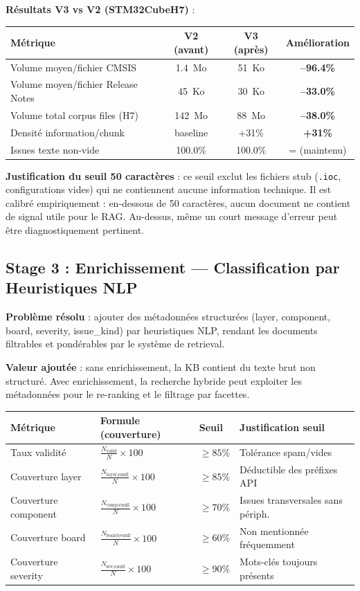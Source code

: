 \documentclass[12pt,a4paper]{report}
\begin{document}
\textbf{Résultats V3 vs V2 (STM32CubeH7)} :

\begin{longtable}{p{5cm}ccc}
\toprule
\textbf{Métrique} & \textbf{V2 (avant)} & \textbf{V3 (après)} & \textbf{Amélioration} \\
\midrule
Volume moyen/fichier CMSIS & 1.4~Mo & 51~Ko & \textbf{--96.4\%} \\
Volume moyen/fichier Release Notes & 45~Ko & 30~Ko & \textbf{--33.0\%} \\
Volume total corpus files (H7) & 142~Mo & 88~Mo & \textbf{--38.0\%} \\
Densité information/chunk & baseline & +31\% & \textbf{+31\%} \\
Issues texte non-vide & 100.0\% & 100.0\% & = (maintenu) \\
\bottomrule
\end{longtable}

\textbf{Justification du seuil 50 caractères} : ce seuil exclut les fichiers stub (\texttt{.ioc}, configurations vides) qui ne contiennent aucune information technique. Il est calibré empiriquement : en-dessous de 50 caractères, aucun document ne contient de signal utile pour le RAG. Au-dessus, même un court message d'erreur peut être diagnostiquement pertinent.

\subsection{Stage 3 : Enrichissement --- Classification par Heuristiques NLP}
\label{sec:eval_enrichment}

\textbf{Problème résolu} : ajouter des métadonnées structurées (layer, component, board, severity, issue\_kind) par heuristiques NLP, rendant les documents filtrables et pondérables par le système de retrieval.

\textbf{Valeur ajoutée} : sans enrichissement, la KB contient du texte brut non structuré. Avec enrichissement, la recherche hybride peut exploiter les métadonnées pour le re-ranking et le filtrage par facettes.

\begin{longtable}{p{4cm}p{5cm}p{2cm}p{3cm}}
\toprule
\textbf{Métrique} & \textbf{Formule (couverture)} & \textbf{Seuil} & \textbf{Justification seuil} \\
\midrule
Taux validité & $\frac{N_{\text{valid}}}{N} \times 100$ & $\geq 85\%$ & Tolérance spam/vides \\
Couverture layer & $\frac{N_{\text{layer}\neq\text{null}}}{N} \times 100$ & $\geq 85\%$ & Déductible des préfixes API \\
Couverture component & $\frac{N_{\text{comp}\neq\text{null}}}{N} \times 100$ & $\geq 70\%$ & Issues transversales sans périph. \\
Couverture board & $\frac{N_{\text{board}\neq\text{null}}}{N} \times 100$ & $\geq 60\%$ & Non mentionnée fréquemment \\
Couverture severity & $\frac{N_{\text{sev}\neq\text{null}}}{N} \times 100$ & $\geq 90\%$ & Mots-clés toujours présents \\
\bottomrule
\end{longtable}
\end{document}
